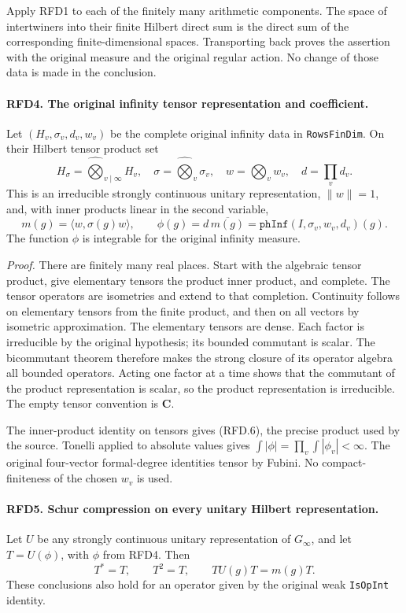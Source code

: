 Apply RFD1 to each of the finitely many arithmetic components.
The space of intertwiners into their finite Hilbert direct sum
is the direct sum of the corresponding finite-dimensional spaces.
Transporting back proves the assertion with the original measure
and the original regular action.  No change of those data is
made in the conclusion.

\paragraph{RFD4. The original infinity tensor representation and coefficient.}
\label{claim:RFD4}
Let \((H_v,\sigma_v,d_v,w_v)\) be the complete original infinity
data in \texttt{RowsFinDim}.  On their Hilbert tensor product set
\[
 H_\sigma=\widehat\bigotimes_{v\mid\infty}H_v,
 \quad \sigma=\widehat\bigotimes_v\sigma_v,
 \quad w=\bigotimes_vw_v,
 \quad d=\prod_vd_v.
 \tag{RFD.5}
\]
This is an irreducible strongly continuous unitary representation,
\(\|w\|=1\), and, with inner products linear in the second variable,
\[
 m(g)=\langle w,\sigma(g)w\rangle,
 \qquad \phi(g)=d\,\overline{m(g)}
       =\texttt{phInf}(I,\sigma_v,w_v,d_v)(g).
 \tag{RFD.6}
\]
The function \(\phi\) is integrable for the original infinity measure.

\emph{Proof.}
There are finitely many real places.  Start with the algebraic
tensor product, give elementary tensors the product inner product,
and complete.  The tensor operators are isometries and extend to
that completion.  Continuity follows on elementary tensors from
the finite product, and then on all vectors by isometric
approximation.  The elementary tensors are dense.  Each factor
is irreducible by the original hypothesis; its bounded commutant
is scalar.  The bicommutant theorem therefore makes the strong
closure of its operator algebra all bounded operators.  Acting
one factor at a time shows that the commutant of the product
representation is scalar, so the product representation is
irreducible.  The empty tensor convention is \(\mathbf C\).

The inner-product identity on tensors gives (RFD.6), the precise
product used by the source.  Tonelli applied to absolute values
gives
\(\int|\phi|=\prod_v\int|\phi_v|<\infty\).
The original four-vector formal-degree identities tensor by
Fubini.  No compact-finiteness of the chosen \(w_v\) is used.

\paragraph{RFD5. Schur compression on every unitary Hilbert representation.}
\label{claim:RFD5}
Let \(U\) be any strongly continuous unitary representation of
\(G_\infty\), and let \(T=U(\phi)\), with \(\phi\) from RFD4.
Then
\[
 T^*=T,\qquad T^2=T,\qquad T U(g)T=m(g)T.
 \tag{RFD.7}
\]
These conclusions also hold for an operator given by the original
weak \texttt{IsOpInt} identity.

